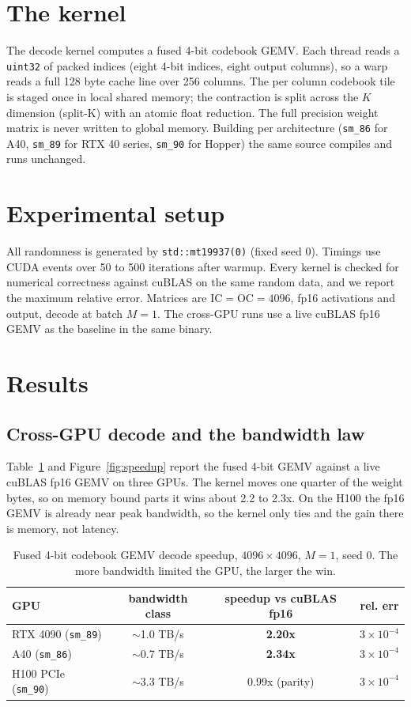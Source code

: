 \documentclass[11pt]{article}
\begin{document}
\section{The kernel}
The decode kernel computes a fused 4-bit codebook GEMV. Each thread reads a
\texttt{uint32} of packed indices (eight 4-bit indices, eight output columns), so
a warp reads a full 128 byte cache line over 256 columns. The per column codebook
tile is staged once in local shared memory; the contraction is split across the
$K$ dimension (split-K) with an atomic float reduction. The full precision weight
matrix is never written to global memory. Building per architecture
(\texttt{sm\_86} for A40, \texttt{sm\_89} for RTX 40 series, \texttt{sm\_90} for
Hopper) the same source compiles and runs unchanged.

\section{Experimental setup}
All randomness is generated by \texttt{std::mt19937(0)} (fixed seed 0). Timings use
CUDA events over 50 to 500 iterations after warmup. Every kernel is checked for
numerical correctness against cuBLAS on the same random data, and we report the
maximum relative error. Matrices are $\text{IC} = \text{OC} = 4096$, fp16
activations and output, decode at batch $M = 1$. The cross-GPU runs use a live
cuBLAS fp16 GEMV as the baseline in the same binary.

\section{Results}

\subsection{Cross-GPU decode and the bandwidth law}
Table~\ref{tab:xgpu} and Figure~\ref{fig:speedup} report the fused 4-bit GEMV
against a live cuBLAS fp16 GEMV on three GPUs. The kernel moves one quarter of the
weight bytes, so on memory bound parts it wins about 2.2 to 2.3x. On the H100 the
fp16 GEMV is already near peak bandwidth, so the kernel only ties and the gain
there is memory, not latency.

\begin{table}[h]
\centering
\begin{tabular}{lccc}
\toprule
GPU & bandwidth class & speedup vs cuBLAS fp16 & rel. err \\
\midrule
RTX 4090 (\texttt{sm\_89}) & $\sim$1.0 TB/s & \textbf{2.20x} & $3{\times}10^{-4}$ \\
A40 (\texttt{sm\_86})      & $\sim$0.7 TB/s & \textbf{2.34x} & $3{\times}10^{-4}$ \\
H100 PCIe (\texttt{sm\_90})& $\sim$3.3 TB/s & 0.99x (parity) & $3{\times}10^{-4}$ \\
\bottomrule
\end{tabular}
\caption{Fused 4-bit codebook GEMV decode speedup, $4096\times4096$, $M=1$, seed 0.
The more bandwidth limited the GPU, the larger the win.}
\label{tab:xgpu}
\end{table}
\end{document}
